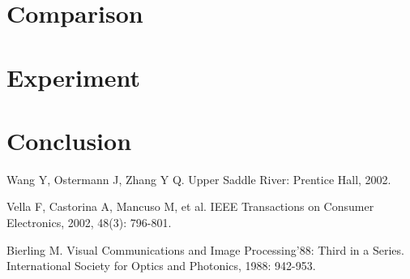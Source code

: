 \documentclass[a4paper, twocolumn]{article}
\begin{document}
	\section{Comparison}
	
	
	
	\section{Experiment}
		
		
	
	\section{Conclusion}
	
	
	
	\begin{thebibliography}{99} %
		
		Wang Y, Ostermann J, Zhang Y Q. 
		\newblock Upper Saddle River: Prentice Hall, 2002.
		
		Vella F, Castorina A, Mancuso M, et al. 
		\newblock IEEE Transactions on Consumer Electronics, 2002, 48(3): 796-801.
		
		Bierling M. 
		\newblock Visual Communications and Image Processing'88: Third in a Series. International Society for Optics and Photonics, 1988: 942-953.
		
	\end{thebibliography}
	
	
\end{document}
